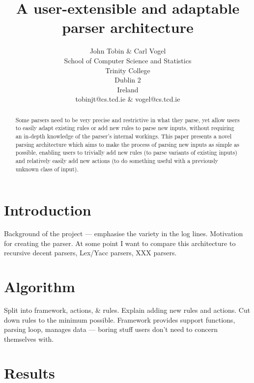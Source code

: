 \documentclass[twocolumn,a4paper,11pt,draft]{article}
\newcounter{dummy}
\begin{document}
\title{A user-extensible and adaptable parser architecture}
\author{John Tobin \& Carl Vogel \\ School of Computer Science and Statistics \\
Trinity College \\ Dublin 2 \\ Ireland \\ tobinjt@cs.tcd.ie \&
vogel@cs.tcd.ie }
\maketitle

\begin{abstract}

    Some parsers need to be very precise and restrictive in what they
    parse, yet allow users to easily adapt existing rules or add new rules
    to parse new inputs, without requiring an in-depth knowledge of the
    parser's internal workings.  This paper presents a novel parsing
    architecture which aims to make the process of parsing new inputs as
    simple as possible, enabling users to trivially add new rules (to parse
    variants of existing inputs) and relatively easily add new actions (to
    do something useful with a previously unknown class of input).

\end{abstract}

\section{Introduction}

Background of the project --- emphasise the variety in the log lines.
Motivation for creating the parser.  At some point I want to compare this
architecture to recursive decent parsers, Lex/Yacc parsers, XXX parsers.

\section{Algorithm}

Split into framework, actions, \& rules.  Explain adding new rules and
actions.  Cut down rules to the minimum possible.  Framework provides
support functions, parsing loop, manages data --- boring stuff users don't
need to concern themselves with.

\section{Results}
\end{document}
